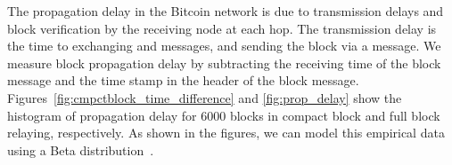 


 The propagation delay in the Bitcoin network is due to transmission delays and block verification by the receiving node at each hop. The transmission delay is the time to exchanging  and  messages, and sending the block via a  message. 
 We measure block propagation delay by subtracting the receiving time of the block message and the time stamp in the header of the block message. Figures~\ref{fig:cmpctblock_time_difference} and \ref{fig:prop_delay} show the histogram of propagation delay for  $6000$ blocks in compact block and full block relaying, respectively. 
As shown in the figures, we can model this empirical data using a Beta distribution~\cite{probabilitybook}. %

